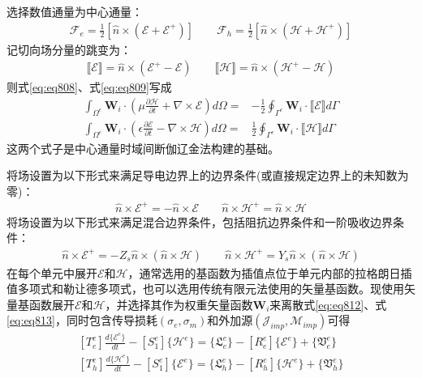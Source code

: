 \documentclass{article}
\numberwithin{equation}{section}
\renewcommand{\vec}[1]{\boldsymbol{#1}}
\begin{document}
选择数值通量为中心通量：
\begin{align}
    \label{eq:eq810}
    \vec{\mathcal{F}}_e=\frac{1}{2}[\hat{n}\times(\vec{\mathcal{E}}+\vec{\mathcal{E}}^+)]\qquad\vec{\mathcal{F}}_h=\frac{1}{2}[\hat{n}\times(\vec{\mathcal{H}}+\vec{\mathcal{H}}^+)]
\end{align}
记切向场分量的跳变为：
\begin{align}
    \label{eq:eq811}
    \llbracket\vec{\mathcal{E}}\rrbracket=\hat{n}\times(\vec{\mathcal{E}}^+-\vec{\mathcal{E}})\qquad\llbracket\vec{\mathcal{H}}\rrbracket=\hat{n}\times(\vec{\mathcal{H}}^+-\vec{\mathcal{H}})
\end{align}
则式\ref{eq:eq808}、式\ref{eq:eq809}写成
\begin{align}
    \label{eq:eq812}
    \int_{\Omega^e}\mathbf{W}_i\cdot\left(\mu\frac{\partial\vec{\mathcal{H}}}{\partial t}+\nabla\times\vec{\mathcal{E}}\right)d\Omega=&-\frac{1}{2}\oint_{\Gamma^e}\mathbf{W}_i\cdot\llbracket\vec{\mathcal{E}}\rrbracket d\Gamma \\
    \label{eq:eq813}
    \int_{\Omega^e}\mathbf{W}_i\cdot\left(\epsilon\frac{\partial\vec{\mathcal{E}}}{\partial t}-\nabla\times\vec{\mathcal{H}}\right)d\Omega=&\frac{1}{2}\oint_{\Gamma^e}\mathbf{W}_i\cdot\llbracket\vec{\mathcal{H}}\rrbracket d\Gamma
\end{align}
这两个式子是中心通量时域间断伽辽金法构建的基础。\par
将场设置为以下形式来满足导电边界上的边界条件(或直接规定边界上的未知数为零)：
\begin{align}
    \label{eq:eq814}
    \hat{n}\times\vec{\mathcal{E}}^+=-\hat{n}\times\vec{\mathcal{E}}\qquad\hat{n}\times\vec{\mathcal{H}}^+=\hat{n}\times\vec{\mathcal{H}}
\end{align}
将场设置为以下形式来满足混合边界条件，包括阻抗边界条件和一阶吸收边界条件：
\begin{align}
    \label{eq:eq815}
    \hat{n}\times\vec{\mathcal{E}}^+=-Z_s\hat{n}\times(\hat{n}\times\vec{\mathcal{H}})\qquad\hat{n}\times\vec{\mathcal{H}}^+=Y_s\hat{n}\times(\hat{n}\times\vec{\mathcal{H}})
\end{align}
在每个单元中展开$\vec{\mathcal{E}}$和$\vec{\mathcal{H}}$，通常选用的基函数为插值点位于单元内部的拉格朗日插值多项式和勒让德多项式，也可以选用传统有限元法使用的矢量基函数。现使用矢量基函数展开$\vec{\mathcal{E}}$和$\vec{\mathcal{H}}$，并选择其作为权重矢量函数$\mathbf{W}_i$来离散式\ref{eq:eq812}、式\ref{eq:eq813}，同时包含传导损耗$(\sigma_e,\sigma_m)$和外加源$(\vec{\mathcal{J}}_{imp},\vec{\mathcal{M}}_{imp})$可得
\begin{align}
    \label{eq:eq816}
    [T_e^e]\frac{d\{\mathcal{E}^e\}}{dt}-[S_1^e]\{\mathcal{H}^e\}=\{\mathfrak{L}_e^e\}-[R_e^e]\{\mathcal{E}^e\}+\{\mathfrak{V}_e^e\} \\
    \label{eq:eq817}
    [T_h^e]\frac{d\{\mathcal{H}^e\}}{dt}-[S_1^e]\{\mathcal{E}^e\}=\{\mathfrak{L}_h^e\}-[R_h^e]\{\mathcal{H}^e\}+\{\mathfrak{V}_h^e\}
\end{align}
\end{document}
